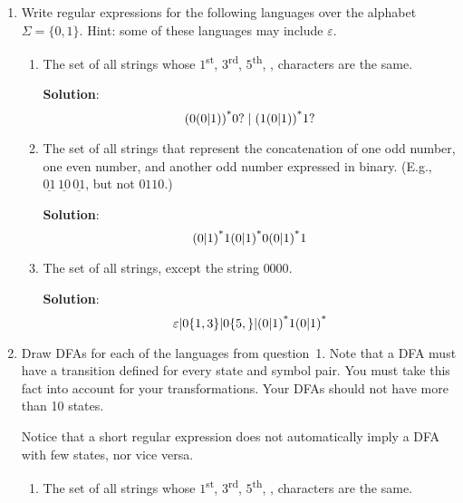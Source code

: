 \documentclass[11pt]{article}
\renewcommand{\epsilon}{\varepsilon}
\begin{document}
\begin{enumerate}
\item Write regular expressions for the following languages over the alphabet $\Sigma = \{0, 1\}$.  Hint: some of these languages may include $\epsilon$.
\begin{enumerate}
    \item The set of all strings whose $1$\textsuperscript{st}, $3$\textsuperscript{rd}, $5$\textsuperscript{th}, \textellipsis, characters are the same.

    \textbf{Solution}:
    \[
        (0(0|1))\textsuperscript{*}0?\hspace{1mm}|\hspace{1mm} (1(0|1))\textsuperscript{*}1?
    \]

    \item The set of all strings that represent the concatenation of one odd number, one even number, and another odd number expressed in binary. (E.g., $\underline{01}\,\underline{10}\,\underline{01}$, but not $0110$.)

    \textbf{Solution}:
    \[
        (0|1)\textsuperscript{*}1(0|1)\textsuperscript{*}0(0|1)\textsuperscript{*}1
    \]

    \item The set of all strings, except the string $0000$.

    \textbf{Solution}:
    \[
        \epsilon|0\{1,3\}|0\{5,\}|(0|1)\textsuperscript{*}1(0|1)\textsuperscript{*}
    \]
\end{enumerate}

\newpage

\item Draw DFAs for each of the languages from question~1. Note that a DFA must have a transition defined for every state and symbol pair. You must take this fact into account for your transformations. Your DFAs should not have more than 10 states.

Notice that a short regular expression does not automatically imply a DFA with few states, nor vice versa.

\begin{enumerate}
    \item The set of all strings whose $1$\textsuperscript{st}, $3$\textsuperscript{rd}, $5$\textsuperscript{th}, \textellipsis, characters are the same.


\end{enumerate}
\end{enumerate}
\end{document}
